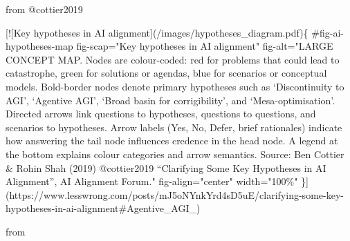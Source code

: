 \documentclass[
  11pt,
  letterpaper,
]{book}
\newenvironment{Shaded}{\begin{snugshade}}{\end{snugshade}}
\newcommand{\CommentTok}[1]{\textcolor[rgb]{0.37,0.37,0.37}{#1}}
\newcommand{\NormalTok}[1]{\textcolor[rgb]{0.00,0.23,0.31}{#1}}
\newcommand{\OtherTok}[1]{\textcolor[rgb]{0.00,0.23,0.31}{#1}}
\begin{document}
\begin{Shaded}
\begin{Highlighting}[]
\NormalTok{from @cottier2019}

\CommentTok{[}\OtherTok{![Key hypotheses in AI alignment}\CommentTok{](/images/hypotheses\_diagram.pdf)}\NormalTok{\{}
\NormalTok{    \#fig{-}ai{-}hypotheses{-}map}
\NormalTok{    fig{-}scap="Key hypotheses in AI alignment"}
\NormalTok{    fig{-}alt="LARGE CONCEPT MAP. Nodes are colour{-}coded: red for problems that could lead to catastrophe, green for solutions or agendas, blue for scenarios or conceptual models. Bold{-}border nodes denote primary hypotheses such as ‘Discontinuity to AGI’, ‘Agentive AGI’, ‘Broad basin for corrigibility’, and ‘Mesa{-}optimisation’. Directed arrows link questions to hypotheses, questions to questions, and scenarios to hypotheses. Arrow labels (Yes, No, Defer, brief rationales) indicate how answering the tail node influences credence in the head node. A legend at the bottom explains colour categories and arrow semantics. Source: Ben Cottier \& Rohin Shah (2019) @cottier2019 “Clarifying Some Key Hypotheses in AI Alignment”, AI Alignment Forum."}
\NormalTok{    fig{-}align="center"}
\NormalTok{    width="100\%"}
\NormalTok{\}](https://www.lesswrong.com/posts/mJ5oNYnkYrd4sD5uE/clarifying{-}some{-}key{-}hypotheses{-}in{-}ai{-}alignment\#Agentive\_AGI\_)}















\end{Highlighting}
\end{Shaded}

from \textcite{metropolitansky2025}
\end{document}
